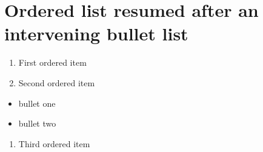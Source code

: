 \documentclass[11pt,a4paper]{article}
\begin{document}
\section{Ordered list resumed after an intervening bullet list}

\begin{enumerate}
\item First ordered item
\item Second ordered item
\end{enumerate}

\begin{itemize}
\item bullet one
\item bullet two
\end{itemize}

\begin{enumerate}
\item Third ordered item
\end{enumerate}
\end{document}
